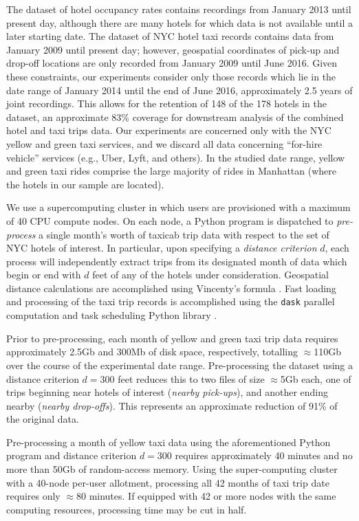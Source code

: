 \documentclass[useAMS, referee, usenatbib]{biom}
\begin{document}
The dataset of hotel occupancy rates contains recordings from January 2013 until present day, although there are many hotels for which data is not available until a later starting date. The dataset of NYC hotel taxi records contains data from January 2009 until present day; however, geospatial coordinates of pick-up and drop-off locations are only recorded from January 2009 until June 2016. Given these constraints, our experiments consider only those records which lie in the date range of January 2014 until the end of June 2016, approximately 2.5 years of joint recordings. This allows for the retention of 148 of the 178 hotels in the dataset, an approximate 83\% coverage for downstream analysis of the combined hotel and taxi trips data. Our experiments are concerned only with the NYC yellow and green taxi services, and we discard all data concerning ``for-hire vehicle'' services (e.g., Uber, Lyft, and others). In the studied date range, yellow and green taxi rides comprise the large majority of rides in Manhattan (where the hotels in our sample are located).

We use a supercomputing cluster in which users are provisioned with a maximum of 40 CPU compute nodes. On each node, a Python program is dispatched to \textit{pre-process} a single month's worth of taxicab trip data with respect to the set of NYC hotels of interest. In particular, upon specifying a \textit{distance criterion} $d$, each process will independently extract trips from its designated month of data which begin or end with $d$ feet of any of the hotels under consideration. Geospatial distance calculations are accomplished using Vincenty's formula \citep{bessel_calculation_2010}. Fast loading and processing of the taxi trip records is accomplished using the \texttt{dask} parallel computation and task scheduling Python library \citep{dask}.

Prior to pre-processing, each month of yellow and green taxi trip data requires approximately 2.5Gb and 300Mb of disk space, respectively, totalling $\approx$110Gb over the course of the experimental date range. Pre-processing the dataset using a distance criterion $d = 300$ feet reduces this to two files of size $\approx$5Gb each, one of trips beginning near hotels of interest (\textit{nearby pick-ups}), and another ending nearby (\textit{nearby drop-offs}). This represents an approximate reduction of 91\% of the original data.

Pre-processing a month of yellow taxi data using the aforementioned Python program and distance criterion $d = 300$ requires approximately 40 minutes and no more than 50Gb of random-access memory. Using the super-computing cluster with a 40-node per-user allotment, processing all 42 months of taxi trip date requires only $\approx$80 minutes. If equipped with 42 or more nodes with the same computing resources, processing time may be cut in half.
\end{document}
